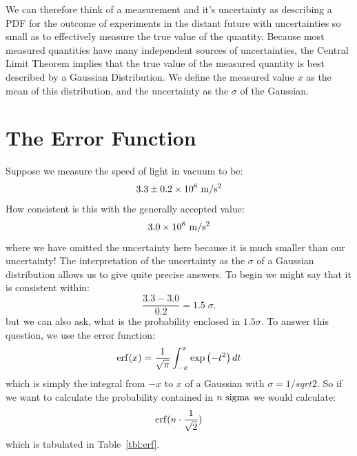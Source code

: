 \documentclass[12pt,oneside]{book}
\begin{document}
We can therefore think of a measurement and it's uncertainty as describing a PDF for the outcome of  experiments in the distant future with uncertainties so small as to effectively measure the true value of the quantity.  Because most measured quantities have many independent sources of uncertainties, the Central Limit Theorem implies that the true value of the measured quantity is best described by a Gaussian  Distribution.  We define the measured value $x$ as the mean of this distribution, and the uncertainty as the $\sigma$ of the Gaussian.

\section{The Error Function}

Suppose we measure the speed of light in vacuum to be:
\begin{displaymath}
3.3 \pm 0.2 \times 10^8~{\rm m}/{\rm s}^2
\end{displaymath}
How consistent is this with the generally accepted value:
\begin{displaymath}
3.0 \times 10^8~{\rm m}/{\rm s}^2
\end{displaymath}
where we have omitted the uncertainty here because it is much smaller than our uncertainty!   The interpretation of the uncertainty as the $\sigma$ of a Gaussian distribution allows us to give quite precise answers.  To begin we might say that it is consistent within:
\begin{displaymath}
\frac{3.3 - 3.0}{0.2} = 1.5 \; \sigma.
\end{displaymath}
but we can also ask, what is the probability enclosed in $1.5 \sigma$.  To  answer this question, we use the error function:
\begin{displaymath}
{\rm erf}(x) = \frac{1}{\sqrt{\pi}} \int^x_{-x} \exp\left(-t^2 \right) dt
\end{displaymath}
which is simply the integral from $-x$ to $x$ of a Gaussian with $\sigma = 1/sqrt{2}$.  So if we want to calculate the probability contained in $n~\rm sigma$ we would calculate:
\begin{displaymath}
 {\rm erf}(n \cdot \frac{1}{\sqrt{2}})
\end{displaymath}
which is tabulated in Table~\ref{tbl:erf}.\\
\end{document}
